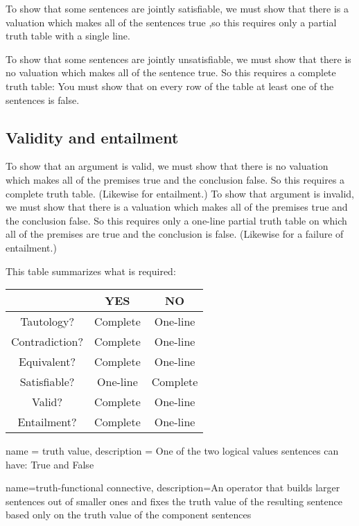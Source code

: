 To show that some sentences are jointly satisfiable, we must show that there is a valuation which makes all of the sentences true ,so this requires only a partial truth table with a single line.

To show that some sentences are jointly unsatisfiable, we must show that there is no valuation which makes all of the sentence true. So this requires a complete truth table: You must show that on every row of the table at least one of the sentences is false.

\subsection{Validity and entailment}

To show that an argument is valid, we must show that there is no valuation which makes all of the premises true and the conclusion false. So this requires a complete truth table. (Likewise for entailment.) To show that argument is invalid, we must show that there is a valuation which makes all of the premises true and the conclusion false. So this requires only a one-line partial truth table on which all of the premises are true and the conclusion is false. (Likewise for a failure of entailment.)

This table summarizes what is required:
\begin{center}
\begin{tabular}{c|c|c}
&YES&NO\\
\hline
Tautology?&Complete&One-line\\
Contradiction?&Complete&One-line\\
Equivalent?&Complete&One-line\\
Satisfiable?&One-line&Complete\\
Valid?&Complete&One-line\\
Entailment?&Complete&One-line\\
\end{tabular}
\end{center}

                 {
                   name = truth value,
                   description = {One of the two logical values sentences can have: True and False}
                   }

{
name=truth-functional connective,
description={An operator that builds larger sentences out of smaller ones and fixes the \gls{truth value} of the resulting sentence based only on the truth value of the component sentences}
}

